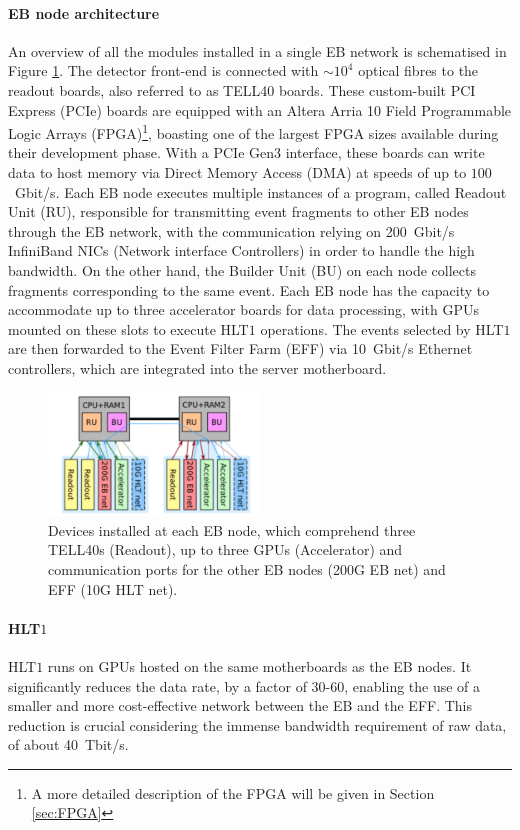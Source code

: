 \paragraph{EB node architecture}
An overview of all the modules installed in a single EB network is schematised in Figure \ref{devices_EBnode}. The detector front-end is connected with $\sim10^{4}$ optical fibres to the readout boards, also referred to as TELL40 boards. These custom-built PCI Express (PCIe) boards are equipped with an Altera Arria 10 Field Programmable Logic Arrays (FPGA)\footnote{A more detailed description of the FPGA will be given in Section \ref{sec:FPGA}}, boasting one of the largest FPGA sizes available during their development phase. With a PCIe Gen3 interface, these boards can write data to host memory via Direct Memory Access (DMA) at speeds of up to $100$~Gbit/s. Each EB node executes multiple instances of a program, called Readout Unit (RU), responsible for transmitting event fragments to other EB nodes through the EB network, with the communication relying on 200~Gbit/s InfiniBand NICs (Network interface Controllers) in order to handle the high bandwidth. On the other hand, the Builder Unit (BU) on each node collects fragments corresponding to the same event. Each EB node has the capacity to accommodate up to three accelerator boards for data processing, with GPUs mounted on these slots to execute HLT$1$ operations. The events selected by HLT$1$ are then forwarded to the Event Filter Farm (EFF) via 10~Gbit/s Ethernet controllers, which are integrated into the server motherboard. 

\begin{figure}
\centering
    \includegraphics[width=0.5\textwidth]{figures/zoom_EB_node.png}
    \caption{Devices installed at each EB node, which comprehend three TELL40s (Readout), up to three GPUs (Accelerator) and communication ports for the other EB nodes (200G EB net) and EFF (10G HLT net).}\label{devices_EBnode}
\end{figure}

\paragraph{HLT$1$}
HLT$1$ runs on GPUs hosted on the same motherboards as the EB nodes. It significantly reduces the data rate, by a factor of 30-60, enabling the use of a smaller and more cost-effective network between the EB and the EFF. This reduction is crucial considering the immense bandwidth requirement of raw data, of about 40~Tbit/s.

